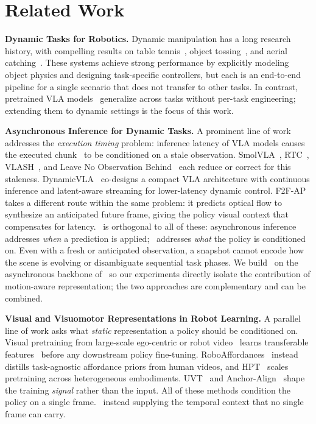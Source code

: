 \section{Related Work}
\label{sec:related-work}

\noindent\textbf{Dynamic Tasks for Robotics.}
Dynamic manipulation has a long research history, with compelling results on table tennis~\cite{tabletennis, mstennis}, object tossing~\cite{zeng2020tossingbot, flingbot}, and aerial catching~\cite{catchit, dynamichandover}. These systems achieve strong performance by explicitly modeling object physics and designing task-specific controllers, but each is an end-to-end pipeline for a single scenario that does not transfer to other tasks. In contrast, pretrained VLA models~\cite{brohan2022rt, driess2023palm, openvla, rt2, octo, pi0, pi05} generalize across tasks without per-task engineering; extending them to dynamic settings is the focus of this work.

\noindent\textbf{Asynchronous Inference for Dynamic Tasks.}
A prominent line of work addresses the \emph{execution timing} problem: inference latency of VLA models causes the executed chunk~\cite{chi2023diffusion,zhao2023act} to be conditioned on a stale observation. SmolVLA~\cite{smolvla}, RTC~\cite{rtc}, VLASH~\cite{vlash}, and Leave No Observation Behind~\cite{leave_no} each reduce or correct for this staleness. DynamicVLA~\cite{dynamicvla} co-designs a compact VLA architecture with continuous inference and latent-aware streaming for lower-latency dynamic control. F2F-AP~\cite{f2fap} takes a different route within the same problem: it predicts optical flow to synthesize an anticipated future frame, giving the policy visual context that compensates for latency. \ours\ is orthogonal to all of these: asynchronous inference addresses \emph{when} a prediction is applied; \ours\ addresses \emph{what} the policy is conditioned on. Even with a fresh or anticipated observation, a snapshot cannot encode how the scene is evolving or disambiguate sequential task phases. We build \ours\ on the asynchronous backbone of~\cite{vlash} so our experiments directly isolate the contribution of motion-aware representation; the two approaches are complementary and can be combined.

\noindent\textbf{Visual and Visuomotor Representations in Robot Learning.}
A parallel line of work asks what \emph{static} representation a policy should be conditioned on. Visual pretraining from large-scale ego-centric or robot video~\cite{r3m, mvp, sensorimotor} learns transferable features~\cite{data4robotics} before any downstream policy fine-tuning. RoboAffordances~\cite{roboaffordances} instead distills task-agnostic affordance priors from human videos, and HPT~\cite{hpt} scales pretraining across heterogeneous embodiments. UVT~\cite{uvt} and Anchor-Align~\cite{anchoralign} shape the training \emph{signal} rather than the input. All of these methods condition the policy on a single frame. \ours\ instead supplying the temporal context that no single frame can carry.

